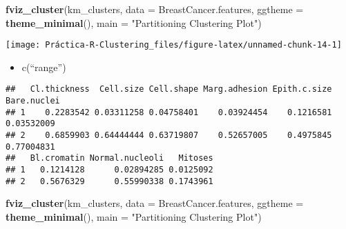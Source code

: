 \documentclass[]{article}
\newenvironment{Shaded}{\begin{snugshade}}{\end{snugshade}}
\newcommand{\CommentTok}[1]{\textcolor[rgb]{0.56,0.35,0.01}{\textit{#1}}}
\newcommand{\DataTypeTok}[1]{\textcolor[rgb]{0.13,0.29,0.53}{#1}}
\newcommand{\DecValTok}[1]{\textcolor[rgb]{0.00,0.00,0.81}{#1}}
\newcommand{\KeywordTok}[1]{\textcolor[rgb]{0.13,0.29,0.53}{\textbf{#1}}}
\newcommand{\NormalTok}[1]{#1}
\newcommand{\OperatorTok}[1]{\textcolor[rgb]{0.81,0.36,0.00}{\textbf{#1}}}
\newcommand{\StringTok}[1]{\textcolor[rgb]{0.31,0.60,0.02}{#1}}
\providecommand{\tightlist}{%
  \setlength{\itemsep}{0pt}\setlength{\parskip}{0pt}}
\begin{document}
\begin{Shaded}
\begin{Highlighting}[]
\KeywordTok{fviz_cluster}\NormalTok{(km_clusters, }\DataTypeTok{data =}\NormalTok{ BreastCancer.features,}
             \DataTypeTok{ggtheme =} \KeywordTok{theme_minimal}\NormalTok{(),}
             \DataTypeTok{main =} \StringTok{"Partitioning Clustering Plot"}\NormalTok{)}
\end{Highlighting}
\end{Shaded}

\begin{center}\texttt{[image: Práctica-R-Clustering\_files/figure-latex/unnamed-chunk-14-1]} \end{center}

\begin{itemize}
\tightlist
\item
  c(``range'')
\end{itemize}

\begin{Shaded}
\end{Shaded}

\begin{verbatim}
##   Cl.thickness  Cell.size Cell.shape Marg.adhesion Epith.c.size Bare.nuclei
## 1    0.2283542 0.03311258 0.04758401    0.03924454    0.1216581  0.03532009
## 2    0.6859903 0.64444444 0.63719807    0.52657005    0.4975845  0.77004831
##   Bl.cromatin Normal.nucleoli   Mitoses
## 1   0.1214128      0.02894285 0.0125092
## 2   0.5676329      0.55990338 0.1743961
\end{verbatim}

\begin{Shaded}
\begin{Highlighting}[]
\KeywordTok{fviz_cluster}\NormalTok{(km_clusters, }\DataTypeTok{data =}\NormalTok{ BreastCancer.features,}
             \DataTypeTok{ggtheme =} \KeywordTok{theme_minimal}\NormalTok{(),}
             \DataTypeTok{main =} \StringTok{"Partitioning Clustering Plot"}\NormalTok{)}
\end{Highlighting}
\end{Shaded}
\end{document}
